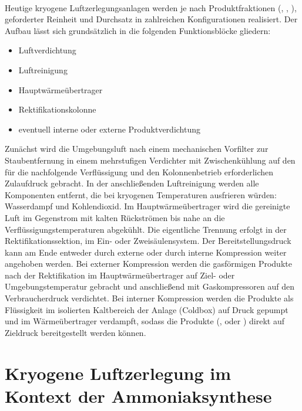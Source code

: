 \\
Heutige kryogene Luftzerlegungsanlagen werden je nach Produktfraktionen (, , ), geforderter Reinheit und Durchsatz in zahlreichen Konfigurationen realisiert. Der Aufbau lässt sich grundsätzlich in die folgenden Funktionsblöcke gliedern:
\begin{itemize}
    \item Luftverdichtung 
    \item Luftreinigung
    \item Hauptwärmeübertrager
    \item Rektifikationskolonne
    \item eventuell interne oder externe Produktverdichtung
\end{itemize}
Zunächst wird die Umgebungsluft nach einem mechanischen Vorfilter zur Staubentfernung in einem mehrstufigen Verdichter mit Zwischenkühlung auf den für die nachfolgende Verflüssigung und den Kolonnenbetrieb erforderlichen Zulaufdruck gebracht. In der anschließenden Luftreinigung werden alle Komponenten entfernt, die bei kryogenen Temperaturen ausfrieren würden: Wasserdampf und Kohlendioxid. Im Hauptwärmeübertrager wird die gereinigte Luft im Gegenstrom mit kalten Rückströmen bis nahe an die Verflüssigungstemperaturen abgekühlt. Die eigentliche Trennung erfolgt in der Rektifikationssektion, im Ein- oder Zweisäulensystem. Der Bereitstellungsdruck kann am Ende entweder durch externe oder durch interne Kompression weiter angehoben werden. Bei externer Kompression werden die gasförmigen Produkte nach der Rektifikation im Hauptwärmeübertrager auf Ziel- oder Umgebungstemperatur gebracht und anschließend mit Gaskompressoren auf den Verbraucherdruck verdichtet. Bei interner Kompression werden die Produkte als Flüssigkeit im isolierten Kaltbereich der Anlage (Coldbox) auf Druck gepumpt und im Wärmeübertrager verdampft, sodass die Produkte (,  oder ) direkt auf Zieldruck bereitgestellt werden können. \cite{teschComparativeEvaluationCryogenic2020, heinz-wolfgangharingAirGasesNitrogen2007}

\section{Kryogene Luftzerlegung im Kontext der Ammoniaksynthese}
\label{sec:grundlagen_ammoinaksynthese}


